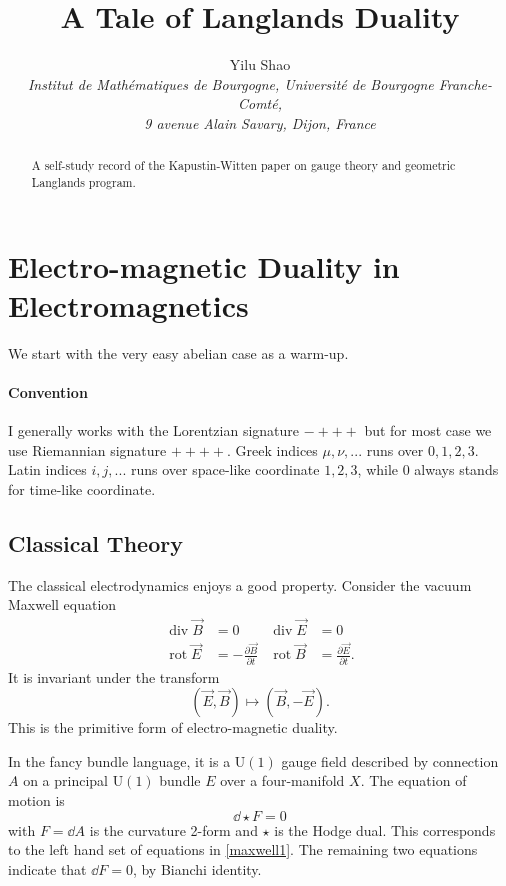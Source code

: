 \documentclass{article}
\title{A Tale of Langlands Duality}
\author{Yilu Shao\\ \footnotesize{\it Institut de Mathématiques de Bourgogne, Université de Bourgogne Franche-Comté,}\\ \footnotesize{\it 9 avenue Alain Savary, Dijon, France}}
\date{}
\numberwithin{equation}{section}
\begin{document}
\maketitle

\begin{abstract}
    A self-study record of the Kapustin-Witten paper \cite{Kapustin:2006pk} on gauge theory and geometric Langlands program.
\end{abstract}

\section{Electro-magnetic Duality in Electromagnetics}
We start with the very easy abelian case as a warm-up. 
\paragraph{Convention}
I generally works with the Lorentzian signature $-+++$ but for most case we use Riemannian signature $++++$. Greek indices $\mu,\nu,...$ runs over $0,1,2,3$. Latin indices $i,j,...$ runs over space-like coordinate $1,2,3$, while $0$ always stands for time-like coordinate.

\subsection{Classical Theory}
The classical electrodynamics enjoys a good property. Consider the vacuum Maxwell equation
\begin{equation}
\begin{aligned}
\label{maxwell1}
\operatorname{div} \vec{{B}} &=0 &\operatorname{div} \vec{E} &=0  \\
\operatorname{rot} \vec{E} &=-\frac{\partial \vec{B}}{\partial t} & \operatorname{rot} \vec{B} &=\frac{\partial \vec{E}}{\partial t}.
\end{aligned}
\end{equation}
It is invariant under the transform
\begin{equation}
\label{em1}
  (\vec{E},\vec{B})\mapsto(\vec{B},-\vec{E}).
\end{equation}
This is the primitive form of electro-magnetic duality.

In the fancy bundle language, it is a $\mathrm{U}(1)$ gauge field described by connection $A$ on a principal $\mathrm{U}(1)$ bundle $E$ over a four-manifold $X$. The equation of motion is
\begin{equation}
\label{maxwell2}
\dd \star F=0
\end{equation}
with $F=\dd A$ is the curvature 2-form and $\star$ is the Hodge dual. This corresponds to the left hand set of equations in \eqref{maxwell1}. The remaining two equations indicate that $\dd F=0$, by Bianchi identity.
\end{document}
